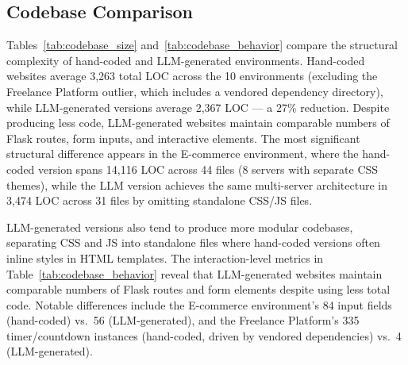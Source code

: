 \documentclass[12pt, a4paper, oneside]{report}
\begin{document}
\subsection{Codebase Comparison}

Tables~\ref{tab:codebase_size} and~\ref{tab:codebase_behavior} compare the structural
complexity of hand-coded and LLM-generated environments. Hand-coded websites average
3,263 total LOC across the 10 environments (excluding the Freelance Platform outlier, which
includes a vendored dependency directory), while LLM-generated versions average 2,367 LOC ---
a 27\% reduction. Despite producing less code, LLM-generated websites maintain comparable
numbers of Flask routes, form inputs, and interactive elements. The most significant structural
difference appears in the E-commerce environment, where the hand-coded version spans 14,116 LOC
across 44 files (8 servers with separate CSS themes), while the LLM version achieves the same
multi-server architecture in 3,474 LOC across 31 files by omitting standalone CSS/JS files.

LLM-generated versions also tend to produce more modular codebases, separating CSS and JS
into standalone files where hand-coded versions often inline styles in HTML templates. The
interaction-level metrics in Table~\ref{tab:codebase_behavior} reveal that LLM-generated
websites maintain comparable numbers of Flask routes and form elements despite using less
total code. Notable differences include the E-commerce environment's 84 input fields
(hand-coded) vs.\ 56 (LLM-generated), and the Freelance Platform's 335 timer/countdown
instances (hand-coded, driven by vendored dependencies) vs.\ 4 (LLM-generated).
\end{document}
